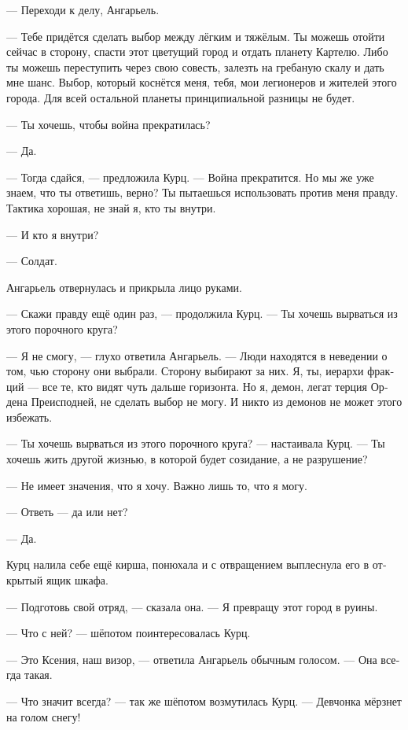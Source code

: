 \documentclass[a4paper,12pt,fleqn]{book}\usepackage{polyglossia}\setdefaultlanguage[babelshorthands=true]{russian}\setotherlanguage{english}\defaultfontfeatures{Ligatures=TeX,Mapping=tex-text}\usepackage{xcolor}\newcommand{\ml}[3]{#2}
\newcommand{\asterism}{\vspace{1em}{\centering\Large\bfseries$\ast~\ast~\ast$\par}\vspace{1em}}
\begin{document}
--- Переходи к делу, Ангарьель.

--- Тебе придётся сделать выбор между лёгким и тяжёлым.
Ты можешь отойти сейчас в сторону, спасти этот цветущий город и отдать планету Картелю.
Либо ты можешь переступить через свою совесть, залезть на гребаную скалу и дать мне шанс.
Выбор, который коснётся меня, тебя, мои легионеров и жителей этого города.
Для всей остальной планеты принципиальной разницы не будет.

--- Ты хочешь, чтобы война прекратилась?

--- Да.

--- Тогда сдайся, --- предложила Курц.
--- Война прекратится.
Но мы же уже знаем, что ты ответишь, верно?
Ты пытаешься использовать против меня правду.
Тактика хорошая, не знай я, кто ты внутри.

--- И кто я внутри?

--- Солдат.

Ангарьель отвернулась и прикрыла лицо руками.

--- Скажи правду ещё один раз, --- продолжила Курц.
--- Ты хочешь вырваться из этого порочного круга?

--- Я не смогу, --- глухо ответила Ангарьель.
--- Люди находятся в неведении о том, чью сторону они выбрали.
Сторону выбирают за них.
Я, ты, иерархи фракций --- все те, кто видят чуть дальше горизонта.
Но я, демон, легат терция Ордена Преисподней, не сделать выбор не могу.
И никто из демонов не может этого избежать.

--- Ты хочешь вырваться из этого порочного круга? --- настаивала Курц.
--- Ты хочешь жить другой жизнью, в которой будет созидание, а не разрушение?

--- Не имеет значения, что я хочу.
Важно лишь то, что я могу.

--- Ответь --- да или нет?

--- Да.

Курц налила себе ещё кирша, понюхала и с отвращением выплеснула его в открытый ящик шкафа.

--- Подготовь свой отряд, --- сказала она.
--- Я превращу этот город в руины.

\asterism

--- Что с ней? --- шёпотом поинтересовалась Курц.

--- Это Ксения, наш визор, --- ответила Ангарьель обычным голосом.
--- Она всегда такая.

--- Что значит всегда? --- так же шёпотом возмутилась Курц.
--- Девчонка мёрзнет на голом снегу!
\end{document}
